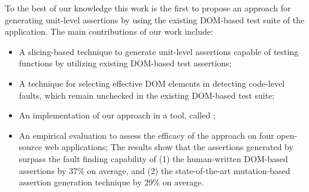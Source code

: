 To the best of our knowledge this work is the first to propose an approach for generating unit-level assertions by using the existing DOM-based test suite of the application. The main contributions of our work include:
\begin{itemize}[noitemsep]
\item A slicing-based technique to generate unit-level assertions capable of testing \javascript functions by utilizing existing DOM-based test assertions;
\item A technique for selecting effective DOM elements in detecting code-level faults, which remain unchecked in the existing DOM-based test suite;
\item An implementation of our approach in a tool, called \atrina; 
\item An empirical evaluation to assess the efficacy of the approach on four open-source web applications;
The results show that the assertions generated by \atrina surpass the fault finding capability of (1) the human-written DOM-based assertions by 37\% on average, and (2) the state-of-the-art mutation-based assertion generation technique by 29\% on average.
\end{itemize} 